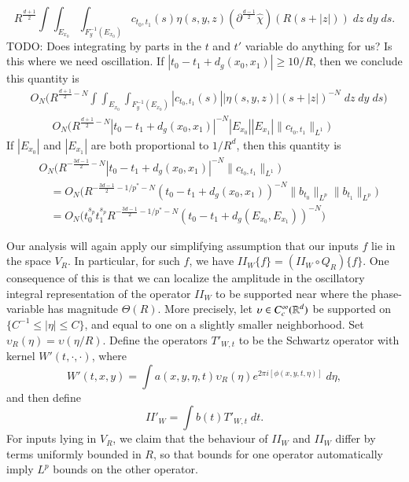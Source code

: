 %
\[ R^{\frac{d+1}{2}} \int \int_{E_{x_0}} \int_{F_y^{-1}(E_{x_0})} c_{t_0,t_1}(s) \eta(s,y,z) (\partial^{\frac{d-1}{2}} \widehat{\chi} )(R(s + |z|))\; dz\; dy\; ds. \]
%
TODO: Does integrating by parts in the $t$ and $t'$ variable do anything for us? Is this where we need oscillation. If $|t_0 - t_1 + d_g(x_0,x_1)| \geq 10/R$, then we conclude this quantity is
%
\begin{align*}
    & O_N \Big( R^{\frac{d+1}{2}-N} \int \int_{E_{x_0}} \int_{F_y^{-1}(E_{x_0})} |c_{t_0,t_1}(s)| |\eta(s,y,z)| (s + |z|)^{-N}\; dz\; dy\; ds \Big)\\
    &\quad\quad O_N \Big( R^{\frac{d+1}{2} - N} |t_0 - t_1 + d_g(x_0,x_1)|^{-N} |E_{x_0}| |E_{x_1}| \| c_{t_0,t_1} \|_{L^1} \Big)
\end{align*}
%
If $|E_{x_0}|$ and $|E_{x_1}|$ are both proportional to $1/R^d$, then this quantity is
%
\begin{align*}
    & O_N \Big( R^{-\frac{3d-1}{2} - N} |t_0 - t_1 + d_g(x_0,x_1)|^{-N} \| c_{t_0,t_1} \|_{L^1} \Big)\\
    &\quad = O_N \Big( R^{-\frac{3d-1}{2} - 1/p^* - N} (t_0 - t_1 + d_g(x_0,x_1))^{-N} \| b_{t_0} \|_{L^p} \| b_{t_1} \|_{L^p} \Big)\\
    &\quad = O_N \Big( t_0^{s_p} t_1^{s_p} R^{-\frac{3d-1}{2} - 1/p^* - N} (t_0 - t_1 + d_g(E_{x_0}, E_{x_1}))^{-N} \Big)
\end{align*}







Our analysis will again apply our simplifying assumption that our inputs $f$ lie in the space $V_R$. In particular, for such $f$, we have $II_W \{ f \} = (II_W \circ Q_R) \{ f \}$. One consequence of this is that we can localize the amplitude in the oscillatory integral representation of the operator $II_W$ to be supported near where the phase-variable has magnitude $\Theta(R)$. More precisely, let $\upsilon \in C_c^\infty(\operatorname{\mathbb{R}}^d)$ be supported on $\{ C^{-1} \leq |\eta| \leq C \}$, and equal to one on a slightly smaller neighborhood. Set $\upsilon_R(\eta) = \upsilon( \eta / R)$. Define the operators $T'_{W,t}$ to be the Schwartz operator with kernel $W'(t,\cdot,\cdot)$, where
%
\[ W'(t,x,y) = \int a(x,y,\eta,t) \upsilon_R(\eta) e^{2 \pi i [ \phi(x,y,t,\eta) ]}\; d\eta, \]
%
and then define
%
\[ II'_W = \int b(t) T'_{W,t}\; dt. \]
%
For inputs lying in $V_R$, we claim that the behaviour of $II_W$ and $II_W$ differ by terms uniformly bounded in $R$, so that bounds for one operator automatically imply $L^p$ bounds on the other operator.

